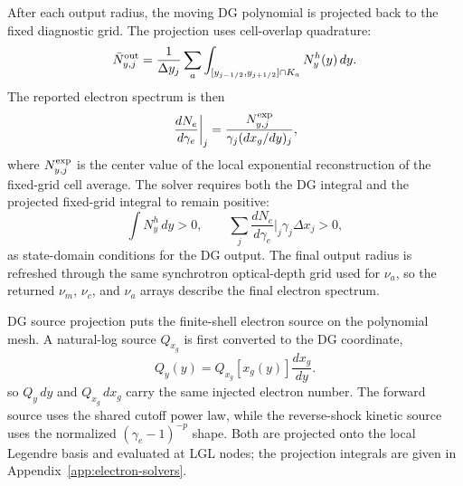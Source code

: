 \documentclass[twocolumn]{aastex702}
\begin{document}
After each output radius, the moving DG polynomial is projected back to the fixed
diagnostic grid.  The projection uses cell-overlap quadrature:
\begin{equation}
\bar N_{y,j}^{\rm out}=
\frac{1}{\Delta y_j}
\sum_a\int_{[y_{j-1/2},y_{j+1/2}]\cap K_a}
N_y^h(y)\,dy .
\end{equation}
The reported electron spectrum is then
\begin{equation}
\left.\frac{dN_e}{d\gamma_e}\right|_j=
\frac{N_{y,j}^{\rm exp}}
{\gamma_j(dx_g/dy)_j},
\end{equation}
where \(N_{y,j}^{\rm exp}\) is the center value of the local exponential
reconstruction of the fixed-grid cell average.  The solver requires both the DG
integral and the projected fixed-grid integral to remain positive:
\begin{equation}
\int N_y^h\,dy>0,\qquad
\sum_j\frac{dN_e}{d\gamma_e}\bigg|_j
\gamma_j\Delta x_j>0,
\end{equation}
as state-domain conditions for the DG output.  The final output radius is
refreshed through the same synchrotron optical-depth grid used for \(\nu_a\), so
the returned \(\nu_m\), \(\nu_c\), and \(\nu_a\) arrays describe the final
electron spectrum.

DG source projection puts the finite-shell electron source on the polynomial
mesh.  A natural-log source \(Q_{x_g}\) is first converted to the DG coordinate,
\begin{equation}
Q_y(y)=Q_{x_g}[x_g(y)]\frac{dx_g}{dy}.
\end{equation}
so \(Q_y\,dy\) and \(Q_{x_g}\,dx_g\) carry the same injected electron number.
The forward source uses the shared cutoff power law, while the reverse-shock
kinetic source uses the normalized \((\gamma_e-1)^{-p}\) shape.  Both are
projected onto the local Legendre basis and evaluated at LGL nodes; the
projection integrals are given in Appendix~\ref{app:electron-solvers}.
\end{document}
